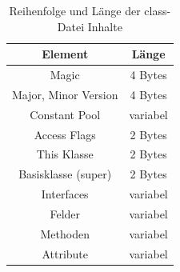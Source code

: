 \documentclass[conference]{IEEEtran}
\begin{document}
\begin{table}[htbp]
\caption{Reihenfolge und Länge der class-Datei Inhalte}
\begin{center}
\begin{tabular}{|c|c|}
\hline
\textbf{Element} & \textbf{Länge} \\
\hline
Magic & 4 Bytes\\
\hline
Major, Minor Version & 4 Bytes\\
\hline
Constant Pool & variabel \\
\hline
Access Flags & 2 Bytes \\
\hline
This Klasse & 2 Bytes \\
\hline
Basisklasse (super) & 2 Bytes \\
\hline
Interfaces & variabel \\
\hline
Felder & variabel \\
\hline
Methoden & variabel \\
\hline
Attribute & variabel \\
\hline
\end{tabular}
\label{tab1}
\end{center}
\end{table}
\end{document}
